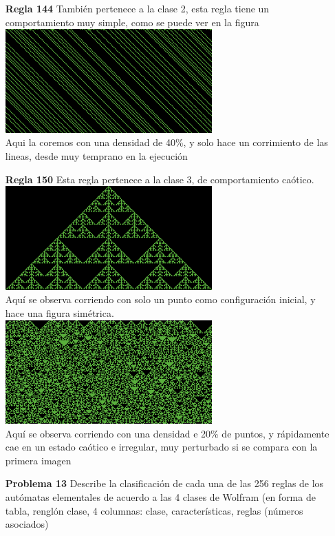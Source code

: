 \documentclass{article}
\begin{document}
\begin{enumerate}
\item[\bf{Regla 144}] También pertenece a la clase 2, esta regla tiene un comportamiento muy simple, como se puede ver en la figura\\
\includegraphics[width=300px]{144-40.png}\\
Aqui la coremos con una densidad de 40\%, y solo hace un corrimiento de las lineas, desde muy temprano en la ejecución

\item[\bf{Regla 150}] Esta regla pertenece a la clase 3, de comportamiento caótico.\\
\includegraphics[width=300px]{150-1.png}\\
Aquí se observa corriendo con solo un punto como configuración inicial, y hace una figura simétrica.\\
\includegraphics[width=300px]{150-20.png}\\
Aquí se observa corriendo con una densidad e 20\% de puntos, y rápidamente cae en un estado caótico e irregular, muy perturbado si se compara con la primera imagen 


\item[\bf{Problema 13}] Describe la clasificación de cada una de las 256 reglas de los autómatas elementales de acuerdo a las 4 clases de Wolfram (en forma de tabla, renglón clase, 4 columnas: clase, características, reglas (números asociados)



\end{enumerate}
\end{document}
